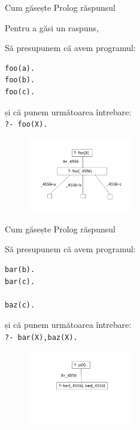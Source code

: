 \documentclass[xcolor=x11names,compress,10pt]{beamer}
\begin{document}
\addtocounter{framenumber}{-1}
\begin{frame}[fragile]{Cum găsește Prolog răspunsul}

Pentru a găsi un raspuns, 

\medskip
\begin{example}
\begin{multicols}{2}
Să presupunem că avem programul: 
\begin{verbatim}
foo(a). 
foo(b). 
foo(c).
\end{verbatim}
și că punem următoarea întrebare: \\
{\color{blue}\texttt{?- foo(X).}}
\columnbreak
\begin{figure}[h]
    \includegraphics[width=0.4\textwidth]{prolog/foo4}

\begin{center}
\end{center}
\end{figure}
\end{multicols}
\end{example}

\end{frame}



\begin{frame}[fragile]{Cum găsește Prolog răspunsul}

\medskip 

\begin{example}
\begin{multicols}{2}
Să presupunem că avem programul: 
\begin{verbatim}
bar(b). 
bar(c). 

baz(c).
\end{verbatim}
și că punem următoarea întrebare: \\
{\color{blue}\texttt{?- bar(X),baz(X).}}
\columnbreak
\begin{figure}[h]
    \includegraphics[width=0.4\textwidth]{prolog/bar1}
\end{figure}
\end{multicols}
\end{example}
\end{frame}
\end{document}
